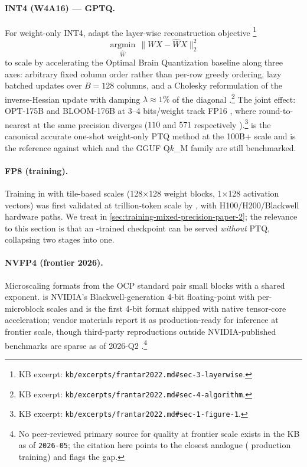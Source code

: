 \paragraph{INT4 (W4A16) --- GPTQ.}
For weight-only INT4, \citet{frantar2022} adapt the layer-wise
reconstruction objective \citep[\S 3, Eq.~1]{frantar2022}\footnote{KB
excerpt: \texttt{kb/excerpts/frantar2022.md\#sec-3-layerwise}.}
\begin{equation}
\operatorname*{argmin}_{\widehat{W}} \, \|W X - \widehat{W} X\|_2^2
\label{eq:gptq-objective}
\end{equation}
to  scale by accelerating the Optimal Brain Quantization baseline
along three axes: arbitrary fixed column order rather than per-row
greedy ordering, lazy batched updates over $B = 128$ columns, and a
Cholesky reformulation of the inverse-Hessian update with damping
$\lambda \approx 1\%$ of the diagonal \citep[\S 4]{frantar2022}.\footnote{KB
excerpt: \texttt{kb/excerpts/frantar2022.md\#sec-4-algorithm}.} The
joint effect: OPT-175B and BLOOM-176B at 3--4 bits/weight track FP16
, where round-to-nearest at the same precision diverges
($110$ and $571$ respectively
\citep[\S 1, Fig.~1]{frantar2022}).\footnote{KB excerpt:
\texttt{kb/excerpts/frantar2022.md\#sec-1-figure-1}.}  is the
canonical accurate one-shot weight-only PTQ method at the 100B+ scale
and is the reference against which  and the GGUF Q$k$\_$\!$M family
are still benchmarked.

\paragraph{FP8 (training).}
Training in  with tile-based scales (128$\times$128 weight blocks,
1$\times$128 activation vectors) was first validated at trillion-token
scale by  \citep[\S 2.5]{deepseek-v3}, with H100/H200/Blackwell
hardware  paths. We treat  in
\cref{sec:training-mixed-precision-paper-2}; the relevance to this
section is that an -trained checkpoint can be served \emph{without}
PTQ, collapsing two stages into one.

\paragraph{NVFP4 (frontier 2026).}
Microscaling formats from the OCP standard pair small blocks with a
shared exponent.  is NVIDIA's Blackwell-generation 4-bit
floating-point with per-microblock scales and is the first 4-bit format
shipped with native tensor-core acceleration; vendor materials report
it as production-ready for inference at frontier scale, though
third-party reproductions outside NVIDIA-published benchmarks are
sparse as of 2026-Q2 \citep[FORUM-SIGNAL]{deepseek-v3}.\footnote{No
peer-reviewed primary source for   quality at frontier scale
exists in the KB as of \texttt{2026-05}; the citation here points to
the closest analogue ( production training) and flags the gap.}

